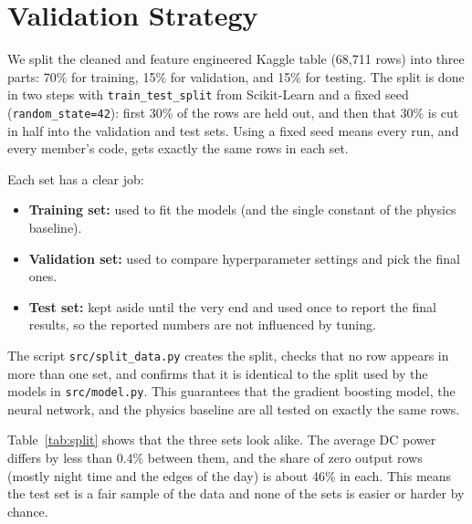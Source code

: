 
\section{Validation Strategy}

We split the cleaned and feature engineered Kaggle table (68,711 rows) into three parts: 70\% for training, 15\% for validation, and 15\% for testing. The split is done in two steps with \texttt{train\_test\_split} from Scikit-Learn and a fixed seed (\texttt{random\_state=42}): first 30\% of the rows are held out, and then that 30\% is cut in half into the validation and test sets. Using a fixed seed means every run, and every member's code, gets exactly the same rows in each set.

Each set has a clear job:

\begin{itemize}
    \item \textbf{Training set:} used to fit the models (and the single constant of the physics baseline).
    \item \textbf{Validation set:} used to compare hyperparameter settings and pick the final ones.
    \item \textbf{Test set:} kept aside until the very end and used once to report the final results, so the reported numbers are not influenced by tuning.
\end{itemize}

The script \texttt{src/split\_data.py} creates the split, checks that no row appears in more than one set, and confirms that it is identical to the split used by the models in \texttt{src/model.py}. This guarantees that the gradient boosting model, the neural network, and the physics baseline are all tested on exactly the same rows.

Table~\ref{tab:split} shows that the three sets look alike. The average DC power differs by less than 0.4\% between them, and the share of zero output rows (mostly night time and the edges of the day) is about 46\% in each. This means the test set is a fair sample of the data and none of the sets is easier or harder by chance.

